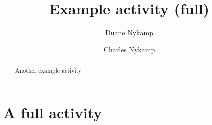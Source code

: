 \documentclass{ximera}
\title{Example activity (full)}
\author{Duane Nykamp \and Charles Nykamp}
\begin{document}
\begin{abstract}
  Another example activity
\end{abstract}
\maketitle
\label{xim:doenetDemo}

\section{A full activity}

\end{document}

